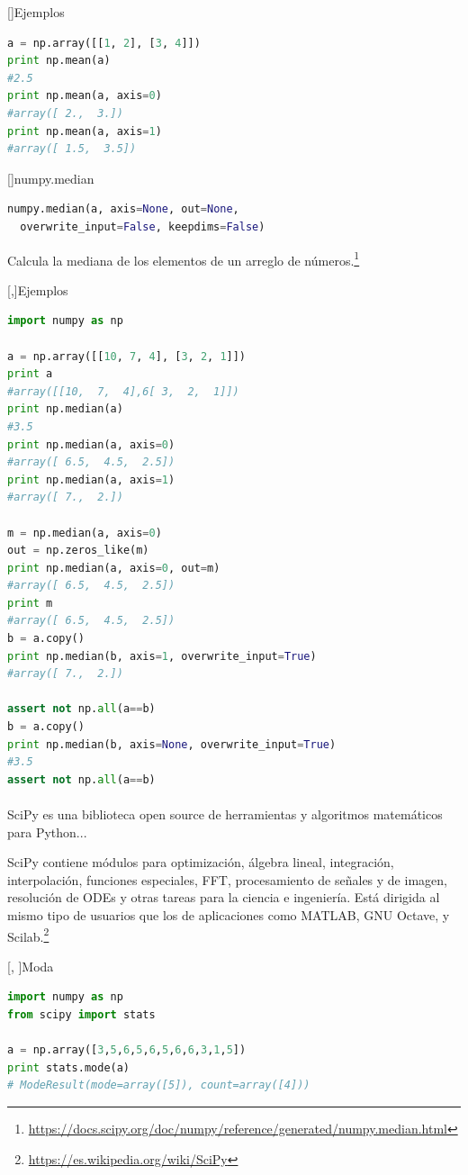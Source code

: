 []{Ejemplos}
 \begin{lstlisting}[language=Python]
a = np.array([[1, 2], [3, 4]])
print np.mean(a)
#2.5
print np.mean(a, axis=0)
#array([ 2.,  3.])
print np.mean(a, axis=1)
#array([ 1.5,  3.5])
\end{lstlisting}


[]{numpy.median}
 \begin{lstlisting}[language=Python]
  numpy.median(a, axis=None, out=None,
  overwrite_input=False, keepdims=False)
\end{lstlisting}

 Calcula la mediana de los elementos de un arreglo de números.\footnote{\href{https://docs.scipy.org/doc/numpy/reference/generated/numpy.median.html}{https://docs.scipy.org/doc/numpy/reference/generated/numpy.median.html}}


[,]{Ejemplos}
 \begin{lstlisting}[language=Python]
import numpy as np

a = np.array([[10, 7, 4], [3, 2, 1]])
print a
#array([[10,  7,  4],6[ 3,  2,  1]])
print np.median(a)
#3.5
print np.median(a, axis=0)
#array([ 6.5,  4.5,  2.5])
print np.median(a, axis=1)
#array([ 7.,  2.])

m = np.median(a, axis=0)
out = np.zeros_like(m)
print np.median(a, axis=0, out=m)
#array([ 6.5,  4.5,  2.5])
print m
#array([ 6.5,  4.5,  2.5])
b = a.copy()
print np.median(b, axis=1, overwrite_input=True)
#array([ 7.,  2.])

assert not np.all(a==b)
b = a.copy()
print np.median(b, axis=None, overwrite_input=True)
#3.5
assert not np.all(a==b)
\end{lstlisting}


\paragraph{}
SciPy es una biblioteca open source de herramientas y algoritmos matemáticos para Python...

SciPy contiene módulos para optimización, álgebra lineal, integración, interpolación, funciones especiales, FFT, procesamiento de señales y de imagen, resolución de ODEs y otras tareas para la ciencia e ingeniería. Está dirigida al mismo tipo de usuarios que los de aplicaciones como MATLAB, GNU Octave, y Scilab.\footnote{\href{https://es.wikipedia.org/wiki/SciPy}{https://es.wikipedia.org/wiki/SciPy}}

[, ]{Moda}
\begin{lstlisting}[language=Python]
import numpy as np
from scipy import stats

a = np.array([3,5,6,5,6,5,6,6,3,1,5])
print stats.mode(a)
# ModeResult(mode=array([5]), count=array([4]))
\end{lstlisting}

